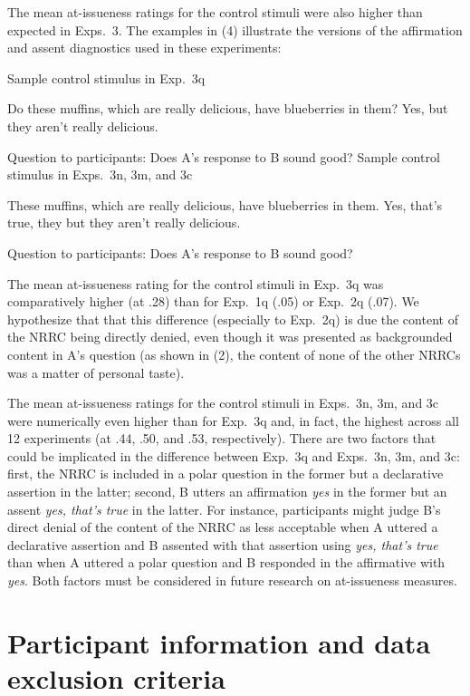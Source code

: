 \documentclass[11pt,fleqn]{article}
\newcommand{\6}{\mbox{$[\hspace*{-.6mm}[$}}
\newcommand{\9}{\mbox{$]\hspace*{-.6mm}]$}}
\begin{document}
The mean at-issueness ratings for the control stimuli were also higher than expected in Exps.~3. The examples in (4) illustrate the versions of the affirmation and assent diagnostics used in these experiments:

\begin{exe}
\begin{xlist}
\ex Sample control stimulus in Exp.~3q
\begin{xlist}
 Do these muffins, which are really delicious, have blueberries in them?
 Yes, but they aren't really delicious.
\end{xlist}
Question to participants: Does A's response to B sound good?
\ex Sample control stimulus in Exps.~3n, 3m, and 3c
\begin{xlist}
 These muffins, which are really delicious, have blueberries in them.
 Yes, that's true, they but they aren't really delicious.
\end{xlist}
Question to participants: Does A's response to B sound good?
\end{xlist}
\end{exe}
The mean at-issueness rating for the control stimuli in Exp.~3q was comparatively higher (at .28) than for Exp.~1q (.05) or Exp.~2q (.07). We hypothesize that that this difference (especially to Exp.~2q) is due the content of the NRRC being directly denied, even though it was presented as backgrounded content in A's question (as shown in (2), the content of none of the other NRRCs was a matter of personal taste).

The mean at-issueness ratings for the control stimuli in Exps.~3n, 3m, and 3c were numerically even higher than for Exp.~3q and, in fact, the highest across all 12 experiments (at .44, .50, and .53, respectively). There are two factors that could be implicated in the difference between Exp.~3q and Exps.~3n, 3m, and 3c: first, the NRRC is included in a polar question in the former but a declarative assertion in the latter; second, B utters an affirmation {\em yes} in the former but an assent {\em yes, that's true} in the latter. For instance, participants might judge B's direct denial of the content of the NRRC as less acceptable when A uttered a declarative assertion and B assented with that assertion using {\em yes, that's true} than when A uttered a polar question and B responded in the affirmative with {\em yes}. Both factors must be considered in future research on at-issueness measures.


\section{Participant information and data exclusion criteria}\label{a-participants}
\end{document}
